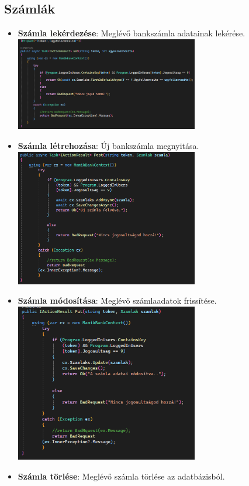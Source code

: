 \documentclass[colorlinks]{thesis-kando}
\theoremstyle{definition}
\theoremstyle{remark}
\begin{document}
\begin{itemize}
\subsection{Számlák}
\begin{itemize}
    \item \textbf{Számla lekérdezése}: Meglévő bankszámla adatainak lekérése.
    \\
    \includegraphics[width=8cm]{figures/szamlalekerdezes.png}
    \newpage
    \item \textbf{Számla létrehozása}: Új bankszámla megnyitása.
    \\
    \includegraphics[width=8cm]{figures/szamlaletrehozas.png}
    \item \textbf{Számla módosítása}: Meglévő számlaadatok frissítése.
    \\
    \includegraphics[width=8cm]{figures/szamlamodositas.png}
    \item \textbf{Számla törlése}: Meglévő számla törlése az adatbázisból.

\end{itemize}
\end{itemize}
\end{document}
